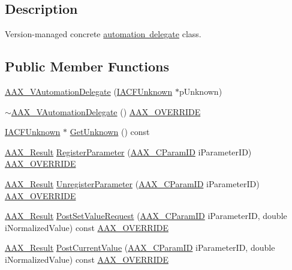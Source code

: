 \subsection{Description}
Version-\/managed concrete \mbox{\hyperlink{a01773}{automation delegate}} class. \subsection*{Public Member Functions}
\begin{DoxyCompactItemize}
\item 
\mbox{\hyperlink{a01893_a4390446f2d57916419490f46b6978826}{A\+A\+X\+\_\+\+V\+Automation\+Delegate}} (\mbox{\hyperlink{a01409}{I\+A\+C\+F\+Unknown}} $\ast$p\+Unknown)
\item 
\mbox{\hyperlink{a01893_a0eecfd63142248e04347455496fb5547}{$\sim$\+A\+A\+X\+\_\+\+V\+Automation\+Delegate}} () \mbox{\hyperlink{a00392_ac2f24a5172689ae684344abdcce55463}{A\+A\+X\+\_\+\+O\+V\+E\+R\+R\+I\+DE}}
\item 
\mbox{\hyperlink{a01409}{I\+A\+C\+F\+Unknown}} $\ast$ \mbox{\hyperlink{a01893_a72870b292b25749928fb52ca6799fc0c}{Get\+Unknown}} () const
\item 
\mbox{\hyperlink{a00392_a4d8f69a697df7f70c3a8e9b8ee130d2f}{A\+A\+X\+\_\+\+Result}} \mbox{\hyperlink{a01893_a763555a4ce0c2683769dd184fd2fa593}{Register\+Parameter}} (\mbox{\hyperlink{a00392_a1440c756fe5cb158b78193b2fc1780d1}{A\+A\+X\+\_\+\+C\+Param\+ID}} i\+Parameter\+ID) \mbox{\hyperlink{a00392_ac2f24a5172689ae684344abdcce55463}{A\+A\+X\+\_\+\+O\+V\+E\+R\+R\+I\+DE}}
\item 
\mbox{\hyperlink{a00392_a4d8f69a697df7f70c3a8e9b8ee130d2f}{A\+A\+X\+\_\+\+Result}} \mbox{\hyperlink{a01893_a35eeea2ece121cca53b285070722899c}{Unregister\+Parameter}} (\mbox{\hyperlink{a00392_a1440c756fe5cb158b78193b2fc1780d1}{A\+A\+X\+\_\+\+C\+Param\+ID}} i\+Parameter\+ID) \mbox{\hyperlink{a00392_ac2f24a5172689ae684344abdcce55463}{A\+A\+X\+\_\+\+O\+V\+E\+R\+R\+I\+DE}}
\item 
\mbox{\hyperlink{a00392_a4d8f69a697df7f70c3a8e9b8ee130d2f}{A\+A\+X\+\_\+\+Result}} \mbox{\hyperlink{a01893_aa5cf0c24ae65a07cb6d4bd523c7ef93a}{Post\+Set\+Value\+Request}} (\mbox{\hyperlink{a00392_a1440c756fe5cb158b78193b2fc1780d1}{A\+A\+X\+\_\+\+C\+Param\+ID}} i\+Parameter\+ID, double i\+Normalized\+Value) const \mbox{\hyperlink{a00392_ac2f24a5172689ae684344abdcce55463}{A\+A\+X\+\_\+\+O\+V\+E\+R\+R\+I\+DE}}
\item 
\mbox{\hyperlink{a00392_a4d8f69a697df7f70c3a8e9b8ee130d2f}{A\+A\+X\+\_\+\+Result}} \mbox{\hyperlink{a01893_a3c2c9825150df103bca6c1e740a01fdb}{Post\+Current\+Value}} (\mbox{\hyperlink{a00392_a1440c756fe5cb158b78193b2fc1780d1}{A\+A\+X\+\_\+\+C\+Param\+ID}} i\+Parameter\+ID, double i\+Normalized\+Value) const \mbox{\hyperlink{a00392_ac2f24a5172689ae684344abdcce55463}{A\+A\+X\+\_\+\+O\+V\+E\+R\+R\+I\+DE}}

\end{DoxyCompactItemize}

